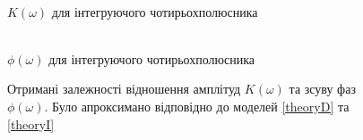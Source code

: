\begin{figure}[h]
\begin{minipage}[h]{0.4\linewidth}
		 \\$K(\omega)$ для інтегруючого чотирьохполюсника
	\end{minipage}
	\hfill
	\begin{minipage}[h]{0.4\linewidth}
		 \\$\phi(\omega)$ для інтегруючого чотирьохполюсника
	\end{minipage}
	\caption{Отримані залежності відношення амплітуд $K(\omega)$ та зсуву фаз $\phi(\omega)$. Було апроксимано відповідно до моделей \ref{theoryD} та \ref{theoryI}}
	\label{fig:expkph}
\end{figure}
